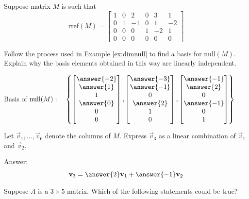 \documentclass{ximera}
\begin{document}
\begin{problem}\label{prob:nullM1}
Suppose matrix $M$ is such that 
$$\mbox{rref}(M)=\begin{bmatrix}1&0&2&0&3&1\\0&1&-1&0&1&-2\\0&0&0&1&-2&1\\0&0&0&0&0&0\end{bmatrix}$$
\begin{question}
Follow the process used in Example \ref{ex:dimnull} to find a basis for $\mbox{null}(M)$.  Explain why the basis elements obtained in this way are linearly independent.

Basis of $\mbox{null}(M):\quad\left\{\begin{bmatrix}\answer{-2}\\\answer{1}\\1\\\answer{0}\\0\\0\end{bmatrix}, \begin{bmatrix}\answer{-3}\\\answer{-1}\\0\\\answer{2}\\1\\0\end{bmatrix}, \begin{bmatrix}\answer{-1}\\\answer{2}\\0\\\answer{-1}\\0\\1\end{bmatrix} \right\}$
\end{question}

\begin{question}
    Let $\vec{v}_1,\ldots,\vec{v}_6$ denote the columns of $M$.  Express $\vec{v}_3$ as a linear combination of $\vec{v}_1$ and $\vec{v}_2$.

Answer:
$$\vec{v}_3=\answer{2}\vec{v}_1+\answer{-1}\vec{v}_2$$
\end{question}
\end{problem}



\begin{problem}\label{prob:truefalse3by5}
Suppose $A$ is a $3\times 5$ matrix.  Which of the following statements could be true?
\begin{selectAll}
 \end{selectAll}
\end{problem}
\end{document}
